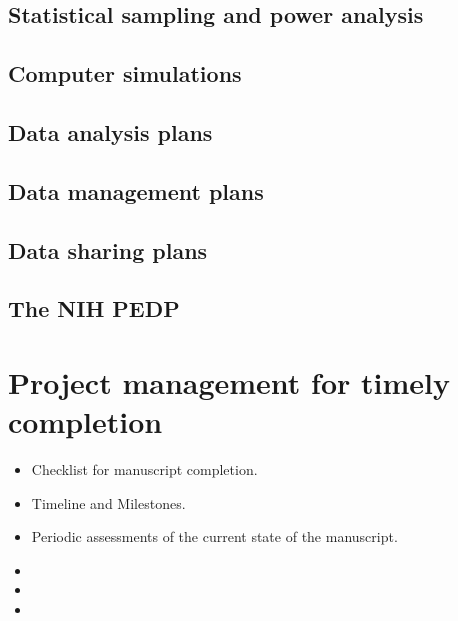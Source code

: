 \documentclass[11pt,letterpaper]{article}
\begin{document}
\subsection{Statistical sampling and power analysis}
\label{sec:orgced3717}



\subsection{Computer simulations}
\label{sec:org4fd230b}


\subsection{Data analysis plans}
\label{sec:org889e133}




\subsection{Data management plans}
\label{sec:org88fab98}




\subsection{Data sharing plans}
\label{sec:org7cc0f1e}




\subsection{The NIH PEDP}
\label{sec:org75e19da}


\section{Project management for timely completion}
\label{sec:org0bbb2f3}

\begin{itemize}
\item Checklist for manuscript completion.
\item Timeline and Milestones.
\item Periodic assessments of the current state of the manuscript.
\item 

\item 

\item 
\end{itemize}
\end{document}
